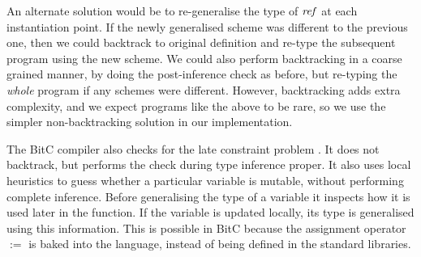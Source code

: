 \bigskip
An alternate solution would be to re-generalise the type of $\operatorname{\mathit{ref}}$ at each instantiation point. If the newly generalised scheme was different to the previous one, then we could backtrack to original definition and re-type the subsequent program using the new scheme. We could also perform backtracking in a coarse grained manner, by doing the post-inference check as before, but re-typing the \emph{whole} program if any schemes were different. However, backtracking adds extra complexity, and we expect programs like the above to be rare, so we use the simpler non-backtracking solution in our implementation.

The BitC compiler also checks for the late constraint problem \cite{sridhar:type-inference-systems-language}. It does not backtrack, but performs the check during type inference proper. It also uses local heuristics to guess whether a particular variable is mutable, without performing complete inference. Before generalising the type of a variable it inspects how it is used later in the function. If the variable is updated locally, its type is generalised using this information. This is possible in BitC because the assignment operator $:=$ is baked into the language, instead of being defined in the standard libraries.

